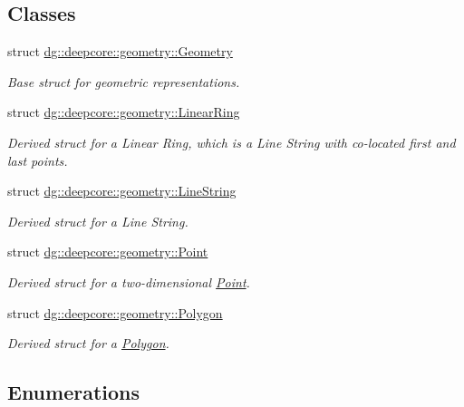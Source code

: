 \subsection*{Classes}
\begin{DoxyCompactItemize}
\item 
struct \hyperlink{structdg_1_1deepcore_1_1geometry_1_1_geometry}{dg\+::deepcore\+::geometry\+::\+Geometry}
\begin{DoxyCompactList}\small\item\em Base struct for geometric representations. \end{DoxyCompactList}\item 
struct \hyperlink{structdg_1_1deepcore_1_1geometry_1_1_linear_ring}{dg\+::deepcore\+::geometry\+::\+Linear\+Ring}
\begin{DoxyCompactList}\small\item\em Derived struct for a Linear Ring, which is a Line String with co-\/located first and last points. \end{DoxyCompactList}\item 
struct \hyperlink{structdg_1_1deepcore_1_1geometry_1_1_line_string}{dg\+::deepcore\+::geometry\+::\+Line\+String}
\begin{DoxyCompactList}\small\item\em Derived struct for a Line String. \end{DoxyCompactList}\item 
struct \hyperlink{structdg_1_1deepcore_1_1geometry_1_1_point}{dg\+::deepcore\+::geometry\+::\+Point}
\begin{DoxyCompactList}\small\item\em Derived struct for a two-\/dimensional \hyperlink{structdg_1_1deepcore_1_1geometry_1_1_point}{Point}. \end{DoxyCompactList}\item 
struct \hyperlink{structdg_1_1deepcore_1_1geometry_1_1_polygon}{dg\+::deepcore\+::geometry\+::\+Polygon}
\begin{DoxyCompactList}\small\item\em Derived struct for a \hyperlink{structdg_1_1deepcore_1_1geometry_1_1_polygon}{Polygon}. \end{DoxyCompactList}\end{DoxyCompactItemize}
\subsection*{Enumerations}

